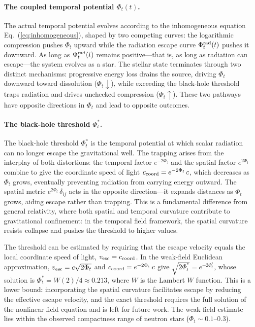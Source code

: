 \documentclass[12pt]{article}
\begin{document}
\paragraph{The coupled temporal potential $\Phi_t(t)$.}

The actual temporal potential evolves according to the inhomogeneous equation Eq.~(\ref{eq:inhomogeneous}), shaped by two competing curves: the logarithmic compression pushes $\Phi_t$ upward while the radiation escape curve $\Phi_t^{\rm rad}(t)$ pushes it downward. As long as $\Phi_t^{\rm rad}(t)$ remains positive---that is, as long as radiation can escape---the system evolves as a star. The stellar state terminates through two distinct mechanisms: progressive energy loss drains the source, driving $\Phi_t$ downward toward dissolution ($\Phi_t \downarrow$), while exceeding the black-hole threshold traps radiation and drives unchecked compression ($\Phi_t \uparrow$). These two pathways have opposite directions in $\Phi_t$ and lead to opposite outcomes.

\paragraph{The black-hole threshold $\Phi_t^*$.}

The black-hole threshold $\Phi_t^*$ is the temporal potential at which scalar radiation can no longer escape the gravitational well. The trapping arises from the interplay of both distortions: the temporal factor $e^{-2\Phi_t}$ and the spatial factor $e^{2\Phi_t}$ combine to give the coordinate speed of light $c_{\rm coord} = e^{-2\Phi_t}\,c$, which decreases as $\Phi_t$ grows, eventually preventing radiation from carrying energy outward. The spatial metric $e^{2\Phi_t}\,\delta_{ij}$ acts in the opposite direction---it expands distances as $\Phi_t$ grows, aiding escape rather than trapping. This is a fundamental difference from general relativity, where both spatial and temporal curvature contribute to gravitational confinement: in the temporal field framework, the spatial curvature resists collapse and pushes the threshold to higher values.

The threshold can be estimated by requiring that the escape velocity equals the local coordinate speed of light, $v_{\rm esc} = c_{\rm coord}$. In the weak-field Euclidean approximation, $v_{\rm esc} = c\sqrt{2\Phi_t}$ and $c_{\rm coord} = e^{-2\Phi_t}\,c$ give $\sqrt{2\Phi_t^*} = e^{-2\Phi_t^*}$, whose solution is $\Phi_t^* = W(2)/4 \approx 0.213$, where $W$ is the Lambert $W$ function. This is a lower bound: incorporating the spatial curvature facilitates escape by reducing the effective escape velocity, and the exact threshold requires the full solution of the nonlinear field equation and is left for future work. The weak-field estimate lies within the observed compactness range of neutron stars ($\Phi_t \sim 0.1$--$0.3$). 
\end{document}
